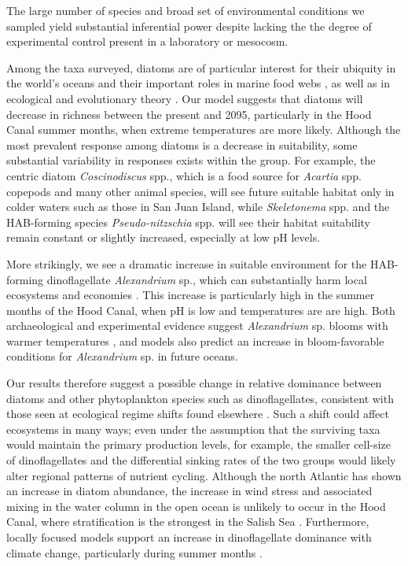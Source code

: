 \documentclass[11pt]{article}
\begin{document}
\begin{linenumbers}
The large number of species and broad set of environmental conditions we sampled yield substantial inferential power despite lacking the the degree of experimental control present in a laboratory or mesocosm. 

Among the taxa surveyed, diatoms are of particular interest for their ubiquity in the world's oceans and their important roles in marine food webs \cite{armbrust2009life, wasmund2017diatom}, as well as in ecological and evolutionary theory \cite{margalef11978}. Our model suggests that diatoms will decrease in richness between the present and 2095, particularly in the Hood Canal summer months, when extreme temperatures are more likely. Although the most prevalent response among diatoms is a decrease in suitability, some substantial variability in responses exists within the group. For example, the centric diatom \textit{Coscinodiscus} spp., which is a food source for \textit{Acartia} spp. copepods \cite{jansen2008copepods} and many other animal species, will see future suitable habitat only in colder waters such as those in San Juan Island, while \textit{Skeletonema} spp. and the HAB-forming species \textit{Pseudo-nitzschia} spp. will see their habitat suitability remain constant or slightly increased, especially at low pH levels.

More strikingly, we see a dramatic increase in suitable environment for the HAB-forming dinoflagellate \textit{Alexandrium} sp., which can substantially harm local ecosystems \cite{colin2002latitudinal} and economies \cite{anderson2000estimated}. This increase is particularly high in the summer months of the Hood Canal, when pH is low and temperatures are are high. Both archaeological and experimental evidence suggest \textit{Alexandrium} sp. blooms with warmer temperatures \cite{mudie2002palynological}, and models \cite{moore2015present} also predict an increase in bloom-favorable conditions for \textit{Alexandrium} sp. in future oceans. 

 Our results therefore suggest a possible change in relative dominance between diatoms and other phytoplankton species such as dinoflagellates, consistent with those seen at ecological regime shifts found elsewhere \cite{wasmund2017diatom, hinder2012changes}. Such a shift could affect ecosystems in many ways; even under the assumption that the surviving taxa would maintain the primary production levels, for example, the smaller cell-size of dinoflagellates and the differential sinking rates of the two groups would likely alter regional patterns of nutrient cycling\cite{xiao2018warming, anderson2002harmful, bienfang1984sinking}. Although the north Atlantic has shown an increase in diatom abundance\cite{hinder2012changes}, the increase in wind stress and associated mixing in the water column in the open ocean is unlikely to occur in the Hood Canal, where stratification is the strongest in the Salish Sea \cite{moore2008descriptive}. Furthermore, locally focused models support an increase in dinoflagellate dominance with climate change, particularly during summer months \cite{khangaonkar2019salish}.
 

\end{linenumbers}
\end{document}
